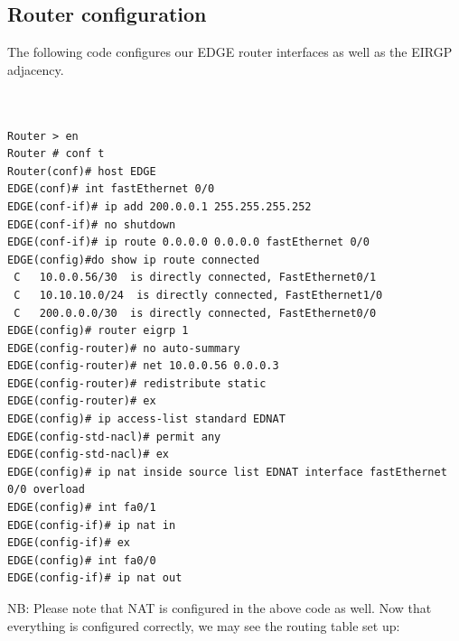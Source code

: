 \documentclass[ a4, 12pt, onecolumn]{IEEEtran}
\begin{document}
 \subsection{Router configuration}
 The following code configures our EDGE router interfaces as well as the EIRGP adjacency.
\begin{center}
\begin{lstlisting}


Router > en
Router # conf t
Router(conf)# host EDGE
EDGE(conf)# int fastEthernet 0/0
EDGE(conf-if)# ip add 200.0.0.1 255.255.255.252
EDGE(conf-if)# no shutdown
EDGE(conf-if)# ip route 0.0.0.0 0.0.0.0 fastEthernet 0/0
EDGE(config)#do show ip route connected
 C   10.0.0.56/30  is directly connected, FastEthernet0/1
 C   10.10.10.0/24  is directly connected, FastEthernet1/0
 C   200.0.0.0/30  is directly connected, FastEthernet0/0
EDGE(config)# router eigrp 1
EDGE(config-router)# no auto-summary
EDGE(config-router)# net 10.0.0.56 0.0.0.3
EDGE(config-router)# redistribute static
EDGE(config-router)# ex
EDGE(config)# ip access-list standard EDNAT
EDGE(config-std-nacl)# permit any
EDGE(config-std-nacl)# ex
EDGE(config)# ip nat inside source list EDNAT interface fastEthernet 0/0 overload 
EDGE(config)# int fa0/1
EDGE(config-if)# ip nat in
EDGE(config-if)# ex
EDGE(config)# int fa0/0
EDGE(config-if)# ip nat out

\end{lstlisting}
\end{center}
NB: Please note that NAT is configured in the above code as well.
Now that everything is configured correctly, we may see the routing table set up:
\end{document}
